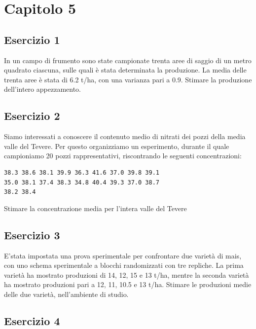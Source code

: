 \documentclass[a4paper,12pt,oneside]{book}
\begin{document}
\hypertarget{capitolo-5}{%
\section{Capitolo 5}\label{capitolo-5}}

\hypertarget{esercizio-1-3}{%
\subsection{Esercizio 1}\label{esercizio-1-3}}

In un campo di frumento sono state campionate trenta aree di saggio di un metro quadrato ciascuna, sulle quali è stata determinata la produzione. La media delle trenta aree è stata di 6.2 t/ha, con una varianza pari a 0.9. Stimare la produzione dell'intero appezzamento.

\hypertarget{esercizio-2-3}{%
\subsection{Esercizio 2}\label{esercizio-2-3}}

Siamo interessati a conoscere il contenuto medio di nitrati dei pozzi della media valle del Tevere. Per questo organizziamo un esperimento, durante il quale campioniamo 20 pozzi rappresentativi, riscontrando le seguenti concentrazioni:

\begin{verbatim}
38.3 38.6 38.1 39.9 36.3 41.6 37.0 39.8 39.1     
35.0 38.1 37.4 38.3 34.8 40.4 39.3 37.0 38.7    
38.2 38.4    
\end{verbatim}

Stimare la concentrazione media per l'intera valle del Tevere

\hypertarget{esercizio-3-3}{%
\subsection{Esercizio 3}\label{esercizio-3-3}}

E'stata impostata una prova sperimentale per confrontare due varietà di mais, con uno schema sperimentale a blocchi randomizzati con tre repliche. La prima varietà ha mostrato produzioni di 14, 12, 15 e 13 t/ha, mentre la seconda varietà ha mostrato produzioni pari a 12, 11, 10.5 e 13 t/ha. Stimare le produzioni medie delle due varietà, nell'ambiente di studio.

\hypertarget{esercizio-4-3}{%
\subsection{Esercizio 4}\label{esercizio-4-3}}
\end{document}
